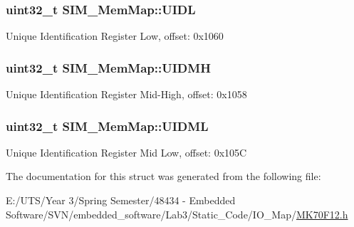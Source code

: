 \subsubsection[{U\+I\+D\+L}]{\setlength{\rightskip}{0pt plus 5cm}uint32\+\_\+t S\+I\+M\+\_\+\+Mem\+Map\+::\+U\+I\+D\+L}\label{struct_s_i_m___mem_map_ac23a694afa8d84e55fc43ff0c0ec1b29}
Unique Identification Register Low, offset\+: 0x1060 \hypertarget{struct_s_i_m___mem_map_af4fb6d5bc3fa71f9c905570d87a2e93f}{}
\subsubsection[{U\+I\+D\+M\+H}]{\setlength{\rightskip}{0pt plus 5cm}uint32\+\_\+t S\+I\+M\+\_\+\+Mem\+Map\+::\+U\+I\+D\+M\+H}\label{struct_s_i_m___mem_map_af4fb6d5bc3fa71f9c905570d87a2e93f}
Unique Identification Register Mid-\/\+High, offset\+: 0x1058 \hypertarget{struct_s_i_m___mem_map_a51e871d8ac13db8b605b6ec1b3292be4}{}
\subsubsection[{U\+I\+D\+M\+L}]{\setlength{\rightskip}{0pt plus 5cm}uint32\+\_\+t S\+I\+M\+\_\+\+Mem\+Map\+::\+U\+I\+D\+M\+L}\label{struct_s_i_m___mem_map_a51e871d8ac13db8b605b6ec1b3292be4}
Unique Identification Register Mid Low, offset\+: 0x105\+C 

The documentation for this struct was generated from the following file\+:\begin{DoxyCompactItemize}
\item 
E\+:/\+U\+T\+S/\+Year 3/\+Spring Semester/48434 -\/ Embedded Software/\+S\+V\+N/embedded\+\_\+software/\+Lab3/\+Static\+\_\+\+Code/\+I\+O\+\_\+\+Map/\hyperlink{_m_k70_f12_8h}{M\+K70\+F12.\+h}\end{DoxyCompactItemize}
